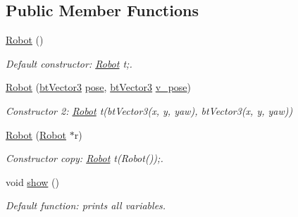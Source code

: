 \subsection*{Public Member Functions}
\begin{DoxyCompactItemize}
\item 
\hyperlink{structcommon_1_1Robot_a41ba088fd67d929808e381126f7b6c2e}{Robot} ()\hypertarget{structcommon_1_1Robot_a41ba088fd67d929808e381126f7b6c2e}{}\label{structcommon_1_1Robot_a41ba088fd67d929808e381126f7b6c2e}

\begin{DoxyCompactList}\small\item\em Default constructor\+: \hyperlink{structcommon_1_1Robot}{Robot} t;. \end{DoxyCompactList}\item 
\hyperlink{structcommon_1_1Robot_a32c611a544e879cf59d66bd87e3884d9}{Robot} (\hyperlink{structcommon_1_1btVector3}{bt\+Vector3} \hyperlink{structcommon_1_1Robot_a31960c8ccd21cde1ca66e263851b83ad}{pose}, \hyperlink{structcommon_1_1btVector3}{bt\+Vector3} \hyperlink{structcommon_1_1Robot_a8114313ba162326a4cb51ce4d5c992f2}{v\+\_\+pose})\hypertarget{structcommon_1_1Robot_a32c611a544e879cf59d66bd87e3884d9}{}\label{structcommon_1_1Robot_a32c611a544e879cf59d66bd87e3884d9}

\begin{DoxyCompactList}\small\item\em Constructor 2\+: \hyperlink{structcommon_1_1Robot}{Robot} t(bt\+Vector3(x, y, yaw), bt\+Vector3(x, y, yaw)) \end{DoxyCompactList}\item 
\hyperlink{structcommon_1_1Robot_a3df83e11a40060ea9d3553384dcdaaa3}{Robot} (\hyperlink{structcommon_1_1Robot}{Robot} $\ast$r)\hypertarget{structcommon_1_1Robot_a3df83e11a40060ea9d3553384dcdaaa3}{}\label{structcommon_1_1Robot_a3df83e11a40060ea9d3553384dcdaaa3}

\begin{DoxyCompactList}\small\item\em Constructor copy\+: \hyperlink{structcommon_1_1Robot}{Robot} t(\+Robot());. \end{DoxyCompactList}\item 
void \hyperlink{structcommon_1_1Robot_a224e3f9997e44c5edf67fd0989aee5cf}{show} ()\hypertarget{structcommon_1_1Robot_a224e3f9997e44c5edf67fd0989aee5cf}{}\label{structcommon_1_1Robot_a224e3f9997e44c5edf67fd0989aee5cf}

\begin{DoxyCompactList}\small\item\em Default function\+: prints all variables. \end{DoxyCompactList}\end{DoxyCompactItemize}
